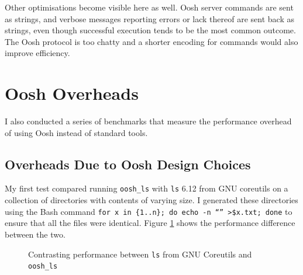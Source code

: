 \documentclass[12pt,twoside,notitlepage]{report}
\begin{document}
Other optimisations become visible here as well. Oosh server commands
are sent as strings, and verbose messages reporting errors or lack
thereof are sent back as strings, even though successful execution
tends to be the most common outcome. The Oosh protocol is too chatty
and a shorter encoding for commands would also improve efficiency.




\section{Oosh Overheads}
I also conducted a series of benchmarks that measure the performance
overhead of using Oosh instead of standard tools.

\subsection{Overheads Due to Oosh Design Choices}
My first test compared running {\tt oosh\_ls} with {\tt ls} 6.12 from
GNU coreutils on a collection of directories with contents of varying
size. I generated these directories using the Bash command {\tt for x
  in \{1..n\}; do echo -n ``'' >\$x.txt; done} to ensure that all the
files were identical. Figure \ref{lsspeed} shows the performance
difference between the two.

\begin{figure}[h]
  \centering
  \setlength\fboxsep{0.5pt}
  \setlength\fboxrule{0.5pt}
  \caption{Contrasting performance between {\tt ls} from GNU Coreutils
    and {\tt oosh\_ls}}
\label{lsspeed}
\end{figure}
\end{document}
